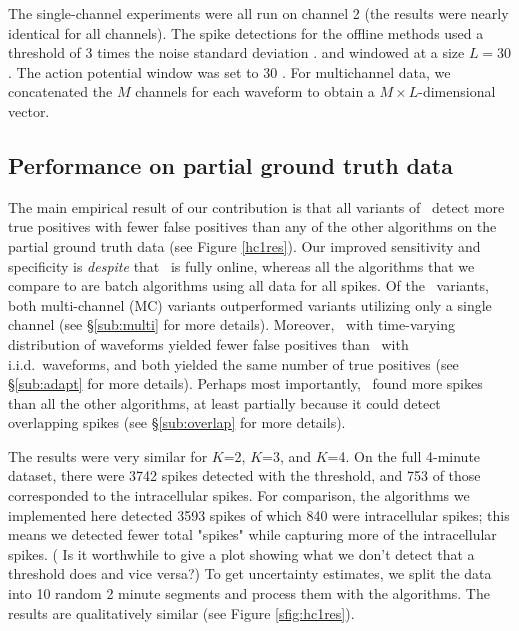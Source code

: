 % 
% 
The single-channel experiments were all run on channel 2 (the results were nearly identical for all channels).  The spike detections for the offline methods used a threshold of 3 times the noise standard deviation \cite{Lewicki}. and windowed at a size $L=30$.  The action potential window was set to 30 .  For multichannel data, we concatenated the $M$ channels for each waveform to obtain a $M\times L$-dimensional vector.



\subsection{Performance on partial ground truth data}

  The main empirical result of our contribution is that all variants of \smug~detect more true positives with fewer false positives
than any of the other algorithms on the partial ground truth data (see Figure \ref{hc1res}).  
Our improved sensitivity and specificity is \emph{despite} that \smug~is fully online, whereas all the algorithms that we compare to are batch algorithms using all data for all spikes.  Of the \smug~variants, both multi-channel (MC) variants outperformed variants utilizing only a single channel (see \S \ref{sub:multi} for more details).  Moreover, \smug~with time-varying distribution of waveforms yielded fewer false positives than \smug~with i.i.d.~waveforms, and both yielded the same number of true positives (see \S \ref{sub:adapt} for more details).  Perhaps most importantly, \smug~found more spikes than all the other algorithms, at least partially because it could detect overlapping spikes (see \S \ref{sub:overlap} for more details).


The results were very similar for $K$=2, $K$=3, and $K$=4.   On the full 4-minute dataset, there were 3742 spikes detected with the threshold, and 753 of those corresponded to the intracellular spikes.  
For comparison, the algorithms we implemented here detected 3593 spikes of which 840 were intracellular spikes; this means we detected fewer total "spikes" while capturing more of the intracellular spikes. ({\color{red}  Is it worthwhile to give a plot showing what we don't detect that a threshold does and vice versa?})
To get uncertainty estimates, we split the data into 10 random 2 minute segments and process them with the algorithms. The results are qualitatively similar (see Figure \ref{sfig:hc1res}).



